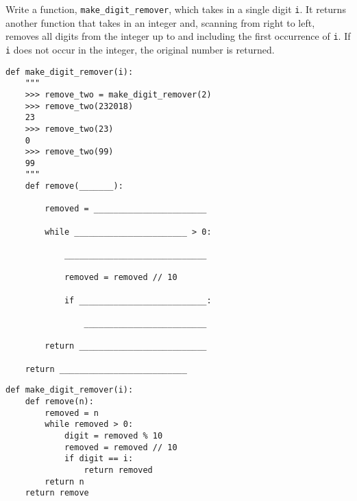 \begin{blocksection}
\question Write a function, \lstinline{make_digit_remover}, which takes in a single digit \texttt{i}. It returns another function that takes in an integer and, scanning from right to left, removes all digits from the integer up to and including the first occurrence of \texttt{i}. If \texttt{i} does not occur in the integer, the original number is returned. 

\begin{lstlisting}
def make_digit_remover(i):
    """
    >>> remove_two = make_digit_remover(2)
    >>> remove_two(232018)
    23
    >>> remove_two(23)
    0
    >>> remove_two(99)
    99
    """
    def remove(_______):

    	removed = _______________________

        while _______________________ > 0:

            _____________________________

            removed = removed // 10

            if __________________________:

                _________________________

        return __________________________

    return __________________________
\end{lstlisting}

\begin{solution}
\begin{lstlisting}
def make_digit_remover(i):
    def remove(n):
        removed = n
        while removed > 0:
            digit = removed % 10
            removed = removed // 10
            if digit == i:
                return removed
        return n
    return remove
\end{lstlisting}
\end{solution}
\end{blocksection}
